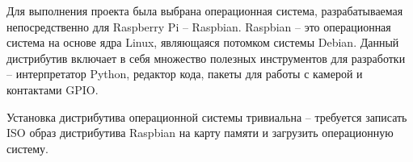 Для выполнения проекта была выбрана операционная система, разрабатываемая непосредственно для Raspberry Pi -- Raspbian. Raspbian -- это операционная система на основе ядра Linux, являющаяся потомком системы Debian. Данный дистрибутив включает в себя множество полезных инструментов для разработки -- интерпретатор Python, редактор кода, пакеты для работы с камерой и контактами GPIO. 

Установка дистрибутива операционной системы тривиальна -- требуется записать ISO образ дистрибутива Raspbian на карту памяти и загрузить операционную систему.



